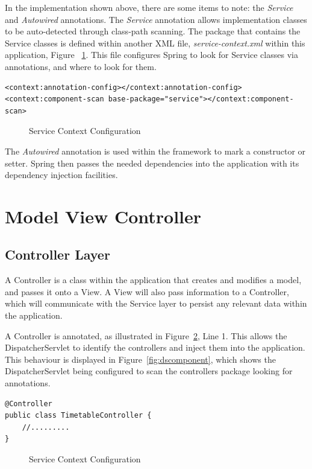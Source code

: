 In the implementation shown above, there are some items to note: the \textit{Service} and \textit{Autowired} annotations. The \textit{Service} annotation allows implementation classes to be auto-detected through class-path scanning. The package that contains the Service classes is defined within another XML file, \textit{service-context.xml} within this application, Figure ~\ref{fig:serviceContext}. This file configures Spring to look for Service classes via annotations, and where to look for them.

\begin{lstlisting}
<context:annotation-config></context:annotation-config>
<context:component-scan base-package="service"></context:component-scan>
\end{lstlisting}
\begin{figure}[H]
\caption{Service Context Configuration}
\label{fig:serviceContext}
\end{figure}

The \textit{Autowired} annotation is used within the framework to mark a constructor or setter. Spring then passes the needed dependencies into the application with its dependency injection facilities. 

\section{Model View Controller}
\subsection{Controller Layer}

A Controller is a class within the application that creates and modifies a model, and passes it onto a View. A View will also pass information to a Controller, which will communicate with the Service layer to persist any relevant data within the application.

A Controller is annotated, as illustrated in Figure~\ref{fig:controller}, Line 1. This allows the DispatcherServlet to identify the controllers and inject them into the application. This behaviour is displayed in Figure~\ref{fig:dscomponent}, which shows the DispatcherServlet being configured to scan the controllers package looking for annotations.

\begin{lstlisting}
@Controller
public class TimetableController {
	//.........
}
\end{lstlisting}
\begin{figure}[H]
\caption{Service Context Configuration}
\label{fig:controller}
\end{figure}

